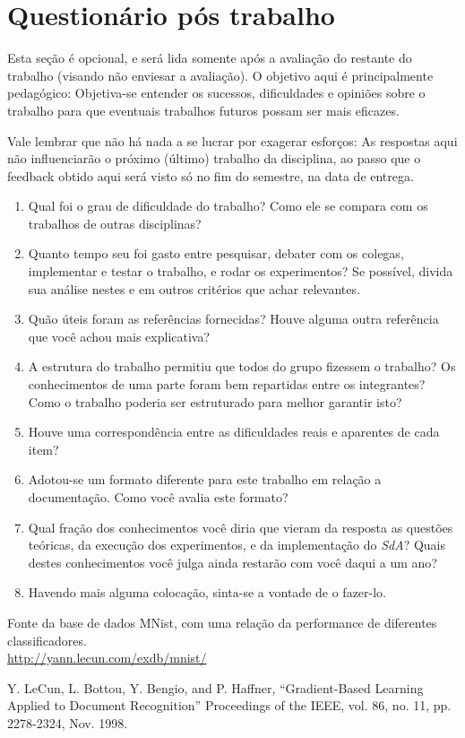\documentclass[12pt, a4paper]{article}
\begin{document}
\pagebreak

\section{Questionário pós trabalho}

Esta seção é opcional, e será lida somente após a avaliação do restante do trabalho (visando não enviesar a avaliação). O objetivo aqui é principalmente pedagógico: Objetiva-se entender os sucessos, dificuldades e opiniões sobre o trabalho para que eventuais trabalhos futuros possam ser mais eficazes.

Vale lembrar que não há nada a se lucrar por exagerar esforços: As respostas aqui não influenciarão o próximo (último) trabalho da disciplina, ao passo que o feedback obtido aqui será visto só no fim do semestre, na data de entrega.

\begin{enumerate}
\item Qual foi o grau de dificuldade do trabalho? Como ele se compara com os trabalhos de outras disciplinas?
\item Quanto tempo seu foi gasto entre pesquisar, debater com os colegas, implementar e testar o trabalho, e rodar os experimentos? Se possível, divida sua análise nestes e em outros critérios que achar relevantes.
\item Quão úteis foram as referências fornecidas? Houve alguma outra referência que você achou mais explicativa?
\item A estrutura do trabalho permitiu que todos do grupo fizessem o trabalho? Os conhecimentos de uma parte foram bem repartidas entre os integrantes? Como o trabalho poderia ser estruturado para melhor garantir isto?
\item Houve uma correspondência entre as dificuldades reais e aparentes de cada item?
\item Adotou-se um formato diferente para este trabalho em relação a documentação. Como você avalia este formato?
\item Qual fração dos conhecimentos você diria que vieram da resposta as questões teóricas, da execução dos experimentos, e da implementação do \emph{SdA}? Quais destes conhecimentos você julga ainda restarão com você daqui a um ano?
\item Havendo mais alguma colocação, sinta-se a vontade de o fazer-lo.
\end{enumerate}


\begin{thebibliography}{99}

	Fonte da base de dados MNist, com uma relação da performance de diferentes classificadores.\\
	\url{http://yann.lecun.com/exdb/mnist/}

	Y. LeCun, L. Bottou, Y. Bengio, and P. Haffner, ``Gradient-Based Learning Applied to Document Recognition'' Proceedings of the IEEE, vol. 86, no. 11, pp. 2278-2324, Nov. 1998.
\end{thebibliography}
\end{document}
